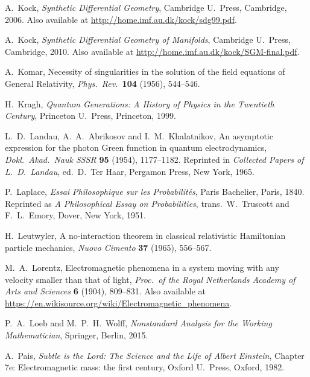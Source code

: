 \documentclass{article}
\begin{document}
\begin{thebibliography}{10}
 A.\ Kock, \textsl{Synthetic Differential Geometry}, 
Cambridge U.\ Press, Cambridge, 2006.  Also available at 
\href{http://home.imf.au.dk/kock/sdg99.pdf}{http://home.imf.au.dk/kock/sdg99.pdf}.

 A.\ Kock, \textsl{Synthetic Differential Geometry of Manifolds},
Cambridge U.\ Press, Cambridge, 2010.  Also available at 
\href{http://home.imf.au.dk/kock/SGM-final.pdf}{http://home.imf.au.dk/kock/SGM-final.pdf}.

 A.\ Komar, Necessity of singularities in the solution of the field equations of General Relativity, \textsl{Phys.\ Rev.\ }\textbf{104} (1956), 544--546.

 H.\ Kragh, \textsl{Quantum Generations: A History of Physics in the Twentieth Century}, Princeton U.\ Press, Princeton, 1999.
 
 L.\ D.\ Landau, A.\ A.\ Abrikosov and I.\ M.\ Khalatnikov, An asymptotic expression for the photon Green function in quantum electrodynamics, \textsl{Dokl.\ Akad.\ Nauk SSSR} \textbf{95} (1954), 1177--1182.  Reprinted in \textsl{Collected Papers of L.\ D.\ Landau}, ed.\ D.\ Ter Haar, Pergamon Press, New York, 1965.

 P.\ Laplace, \textsl{Essai Philosophique sur les Probabilit\'es},  Paris Bachelier, Paris, 1840.  Reprinted as \textsl{A Philosophical Essay on Probabilities}, trans.\ W.\ Truscott and F.\ L.\ Emory, Dover, New York, 1951.

  H.\ Leutwyler, A no-interaction theorem in classical relativistic Hamiltonian particle mechanics, \textsl{Nuovo Cimento} \textbf{37} (1965), 556--567.

 M.\ A.\ Lorentz, Electromagnetic phenomena in a system moving with any velocity smaller than that of light, \textsl{Proc.\ of the Royal Netherlands Academy of Arts and Sciences }{\bf 6} (1904), 809–831.  Also available at \href{https://en.wikisource.org/wiki/Electromagnetic_phenomena}{https://en.wikisource.org/wiki/Electromagnetic\_phenomena}.

  P.\ A.\ Loeb and M.\ P.\ H.\ Wolff, \textsl{Nonstandard Analysis for the Working Mathematician}, Springer, Berlin, 2015.

 A.\ Pais,  \textsl{Subtle is the Lord: The Science and the Life of Albert Einstein}, Chapter 7e: Electromagnetic mass: the first century, Oxford U.\ Press, Oxford, 1982.  


\end{thebibliography}
\end{document}
